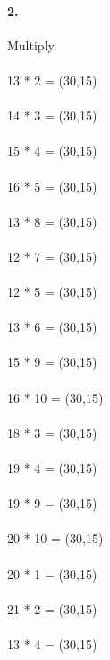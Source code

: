 \documentclass[12pt]{article}
\begin{document}
\paragraph{2.}
Multiply. \\
\\
13 * 2 = \framebox(30,15){}
\\
\\
14 * 3 = \framebox(30,15){}
\\
\\
15 * 4 = \framebox(30,15){}
\\
\\
16 * 5 = \framebox(30,15){}
\\
\\
13 * 8 = \framebox(30,15){}
\\
\\
12 * 7 = \framebox(30,15){}
\\
\\
12 * 5 = \framebox(30,15){}
\\
\\
13 * 6 = \framebox(30,15){}
\\
\\
15 * 9 = \framebox(30,15){}
\\
\\
16 * 10 = \framebox(30,15){}
\\
\\
18 * 3 = \framebox(30,15){}
\\
\\
19 * 4 = \framebox(30,15){}
\\
\\
19 * 9 = \framebox(30,15){}
\\
\\
20 * 10 = \framebox(30,15){}
\\
\\
20 * 1 = \framebox(30,15){}
\\
\\
21 * 2 = \framebox(30,15){}
\\
\\
13 * 4 = \framebox(30,15){}
\end{document}
